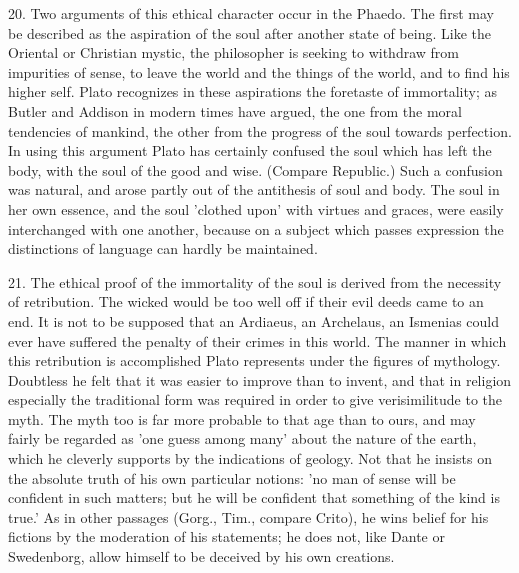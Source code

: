 \documentclass[11pt,letter]{article}
\begin{document}
\par  20. Two arguments of this ethical character occur in the Phaedo. The first may be described as the aspiration of the soul after another state of being. Like the Oriental or Christian mystic, the philosopher is seeking to withdraw from impurities of sense, to leave the world and the things of the world, and to find his higher self. Plato recognizes in these aspirations the foretaste of immortality; as Butler and Addison in modern times have argued, the one from the moral tendencies of mankind, the other from the progress of the soul towards perfection. In using this argument Plato has certainly confused the soul which has left the body, with the soul of the good and wise. (Compare Republic.) Such a confusion was natural, and arose partly out of the antithesis of soul and body. The soul in her own essence, and the soul 'clothed upon' with virtues and graces, were easily interchanged with one another, because on a subject which passes expression the distinctions of language can hardly be maintained.

\par  21. The ethical proof of the immortality of the soul is derived from the necessity of retribution. The wicked would be too well off if their evil deeds came to an end. It is not to be supposed that an Ardiaeus, an Archelaus, an Ismenias could ever have suffered the penalty of their crimes in this world. The manner in which this retribution is accomplished Plato represents under the figures of mythology. Doubtless he felt that it was easier to improve than to invent, and that in religion especially the traditional form was required in order to give verisimilitude to the myth. The myth too is far more probable to that age than to ours, and may fairly be regarded as 'one guess among many' about the nature of the earth, which he cleverly supports by the indications of geology. Not that he insists on the absolute truth of his own particular notions: 'no man of sense will be confident in such matters; but he will be confident that something of the kind is true.' As in other passages (Gorg., Tim., compare Crito), he wins belief for his fictions by the moderation of his statements; he does not, like Dante or Swedenborg, allow himself to be deceived by his own creations.
\end{document}
